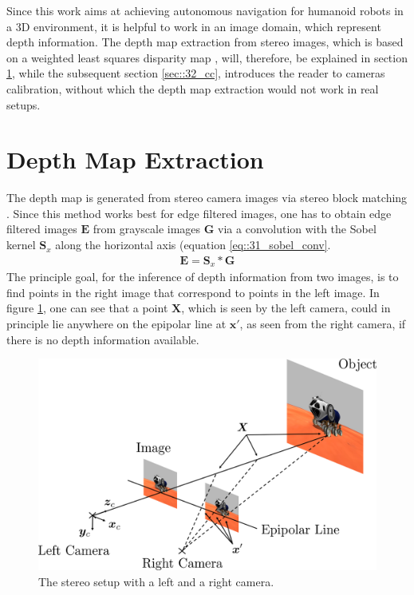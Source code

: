 \FloatBarrier
\label{sec::3_ip}
Since this work aims at achieving autonomous navigation for humanoid robots in a 3D environment, it is helpful to work in an image domain, which represent depth information. The depth map extraction from stereo images, which is based on a weighted least squares disparity map \cite{min2014fast}, will, therefore, be explained in section \ref{sec::31_dm}, while the subsequent section \ref{sec::32_cc}, introduces the reader to cameras calibration, without which the depth map extraction would not work in real setups.
\FloatBarrier
\section{Depth Map Extraction}
\label{sec::31_dm}
The depth map is generated from stereo camera images via stereo block matching \cite{hamzah2010sum}. Since this method works best for edge filtered images, one has to obtain edge filtered images $\bm{E}$ from grayscale images $\bm{G}$ via a convolution with the Sobel kernel $\bm{S}_x$ along the horizontal axis \cite{sobel2014an} (equation \ref{eq::31_sobel_conv}. 
\begin{align}
	\bm{E} = \bm{S}_x*\bm{G}
	\label{eq::31_sobel_conv}
\end{align}
The principle goal, for the inference of depth information from two images, is to find points in the right image that correspond to points in the left image. In figure \ref{fig::31_stereo_camera}, one can see that a point $\bm{X}$, which is seen by the left camera, could in principle lie anywhere on the epipolar line at $\bm{x}'$, as seen from the right camera, if there is no depth information available. 
\begin{figure}[h!]
	\centering
	\includegraphics[scale=.28]{chapters/03_fundamentals_of_image_processing/img/stereo_camera.png}
	\caption{The stereo setup with a left and a right camera.}
	\label{fig::31_stereo_camera}
\end{figure}
